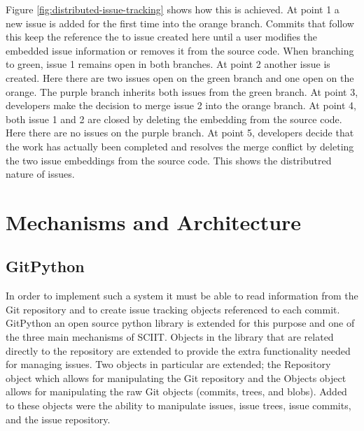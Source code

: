 \documentclass{mproj}
\begin{document}
Figure \ref{fig:distributed-issue-tracking} shows how this is achieved. At point 1 a new issue is added for the first time into the orange branch. Commits that follow this keep the reference the to issue created here until a user modifies the embedded issue information or removes it from the source code. When branching to green, issue 1 remains open in both branches. At point 2 another issue is created. Here there are two issues open on the green branch and one open on the orange. The purple branch inherits both issues from the green branch. At point 3, developers make the decision to merge issue 2 into the orange branch. At point 4, both issue 1 and 2 are closed by deleting the embedding from the source code. Here there are no issues on the purple branch. At point 5, developers decide that the work has actually been completed and resolves the merge conflict by deleting the two issue embeddings from the source code. This shows the distributred nature of issues.


\section{Mechanisms and Architecture}


\subsection{GitPython}

In order to implement such a system it must be able to read information from the Git repository and to create issue tracking objects referenced to each commit. GitPython an open source python library is extended for this purpose and one of the three main mechanisms of SCIIT. Objects in the library that are related directly to the repository are extended to provide the extra functionality needed for managing issues. Two objects in particular are extended; the Repository object which allows for manipulating the Git repository and the Objects object allows for manipulating the raw Git objects (commits, trees, and blobs). Added to these objects were the ability to manipulate issues, issue trees, issue commits, and the issue repository.

\end{document}
